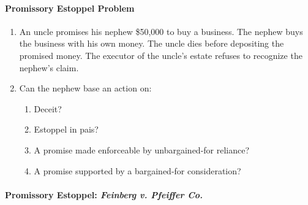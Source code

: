 \paragraph{Promissory Estoppel Problem}

\begin{enumerate}
    \item An uncle promises his nephew \$50,000 to buy a business. The nephew 
    buys the business with his own money. The uncle dies before depositing the 
    promised money. The executor of the uncle's estate refuses to recognize 
    the nephew's claim.
    \item Can the nephew base an action on:
    \begin{enumerate}
        \item Deceit?
        \item Estoppel in pais?
        \item A promise made enforceable by unbargained-for reliance?
        \item A promise supported by a bargained-for consideration?
    \end{enumerate}
\end{enumerate}

\paragraph{Promissory Estoppel: \emph{Feinberg v. Pfeiffer Co.}}

